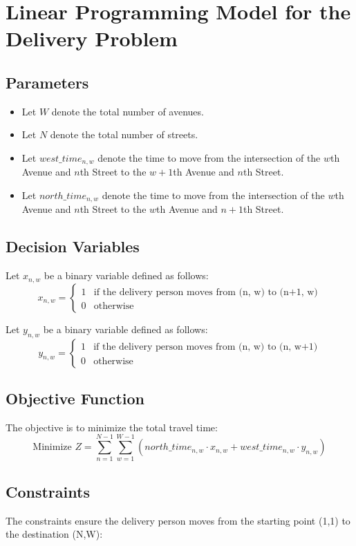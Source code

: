 \documentclass{article}
\begin{document}
\section*{Linear Programming Model for the Delivery Problem}

\subsection*{Parameters}
\begin{itemize}
    \item Let $W$ denote the total number of avenues.
    \item Let $N$ denote the total number of streets.
    \item Let $west\_time_{n,w}$ denote the time to move from the intersection of the $w$th Avenue and $n$th Street to the $w+1$th Avenue and $n$th Street.
    \item Let $north\_time_{n,w}$ denote the time to move from the intersection of the $w$th Avenue and $n$th Street to the $w$th Avenue and $n+1$th Street.
\end{itemize}

\subsection*{Decision Variables}
Let $x_{n,w}$ be a binary variable defined as follows:
\[
x_{n,w} =
\begin{cases}
1 & \text{if the delivery person moves from (n, w) to (n+1, w)} \\
0 & \text{otherwise}
\end{cases}
\]

Let $y_{n,w}$ be a binary variable defined as follows:
\[
y_{n,w} =
\begin{cases}
1 & \text{if the delivery person moves from (n, w) to (n, w+1)} \\
0 & \text{otherwise}
\end{cases}
\]

\subsection*{Objective Function}
The objective is to minimize the total travel time:
\[
\text{Minimize } Z = \sum_{n=1}^{N-1} \sum_{w=1}^{W-1} (north\_time_{n,w} \cdot x_{n,w} + west\_time_{n,w} \cdot y_{n,w})
\]

\subsection*{Constraints}
The constraints ensure the delivery person moves from the starting point (1,1) to the destination (N,W):
\end{document}

